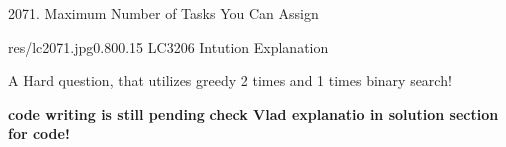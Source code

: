 \begin{problem}{2071. Maximum Number of Tasks You Can Assign}
    
    
    \end{problem}
    
    \begin{solution}
    
    
        \begin{lfigurecp}{res/lc2071.jpg}{0.80}{0.15}
            LC3206 Intution Explanation

            A Hard question, that utilizes greedy 2 times and 1 times binary search!
        \end{lfigurecp}
    
        \textbf{code writing is still pending}
        \textbf{check Vlad explanatio in solution section for code!}
    \end{solution}
        